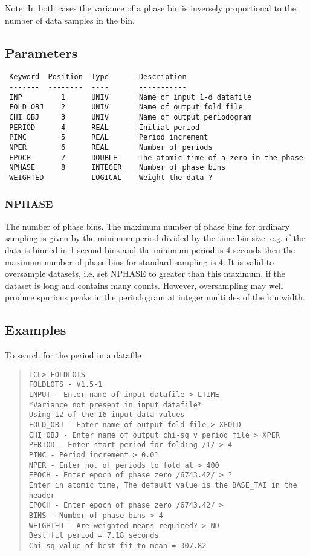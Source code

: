 \documentclass{book}
\renewcommand{\_}{{\tt\char'137}}     %
\begin{document}
Note: In both cases the variance of a phase bin is inversely
proportional to the number of data samples in the bin.

\subsection{Parameters}
\begin{verbatim}
 Keyword  Position  Type       Description
 -------  --------  ----       -----------
 INP         1      UNIV       Name of input 1-d datafile
 FOLD_OBJ    2      UNIV       Name of output fold file
 CHI_OBJ     3      UNIV       Name of output periodogram
 PERIOD      4      REAL       Initial period
 PINC        5      REAL       Period increment
 NPER        6      REAL       Number of periods
 EPOCH       7      DOUBLE     The atomic time of a zero in the phase
 NPHASE      8      INTEGER    Number of phase bins
 WEIGHTED           LOGICAL    Weight the data ?

\end{verbatim}\subsubsection{NPHASE}
The number of phase bins. The maximum number of phase bins for
ordinary sampling is given by the minimum period divided by the
time bin size. e.g. if the data is binned in 1 second bins and
the minimum period is 4 seconds then the maximum number of phase
bins for standard sampling is 4. It is valid to oversample datasets,
i.e. set NPHASE to greater than this maximum, if the dataset is long
and contains many counts. However, oversampling may well produce spurious
peaks in the periodogram at integer multiples of the bin width.

\subsection{Examples}
To search for the period in a datafile
\begin{quote}\begin{verbatim}
ICL> FOLDLOTS
FOLDLOTS - V1.5-1
INPUT - Enter name of input datafile > LTIME
*Variance not present in input datafile*
Using 12 of the 16 input data values
FOLD_OBJ - Enter name of output fold file > XFOLD
CHI_OBJ - Enter name of output chi-sq v period file > XPER
PERIOD - Enter start period for folding /1/ > 4
PINC - Period increment > 0.01
NPER - Enter no. of periods to fold at > 400
EPOCH - Enter epoch of phase zero /6743.42/ > ?
Enter in atomic time, The default value is the BASE_TAI in the header
EPOCH - Enter epoch of phase zero /6743.42/ >
BINS - Number of phase bins > 4
WEIGHTED - Are weighted means required? > NO
Best fit period = 7.18 seconds
Chi-sq value of best fit to mean = 307.82
\end{verbatim}\end{quote}
\end{document}
